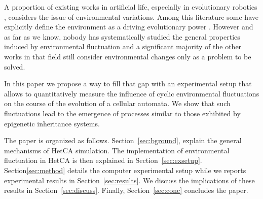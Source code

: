 A proportion of existing works in artificial life, especially in evolutionary robotics \citep{floreano2000evolutionary}, considers the issue of environmental variations. Among this literature some have explicitly define the environment as a driving evolutionary power \citep{bredeche2012environmentdrivenopenende}. However and as far as we know, nobody has systematically studied the general properties induced by environmental fluctuation and a significant majority of the other works in that field still consider environmental changes only as a problem to be solved.   %

In this paper we propose a way to fill that gap with an experimental setup that allows to quantitatively measure the influence of cyclic environmental fluctuations on the course of the evolution of a cellular automata. We show that such fluctuations lead to the emergence of processes similar to those exhibited by epigenetic inheritance systems.

The paper is organized as follows. Section~\ref{sec:bground}, explain the general mechanisms of HetCA simulation. The implementation of environmental fluctuation in HetCA is then explained in Section~\ref{sec:exsetup}. Section\ref{sec:method} details the computer experimental setup while we reports experimental results in Section~\ref{sec:results}. We discuss the implications of these results in Section~\ref{sec:discuss}. Finally, Section~\ref{sec:conc} concludes the paper.



